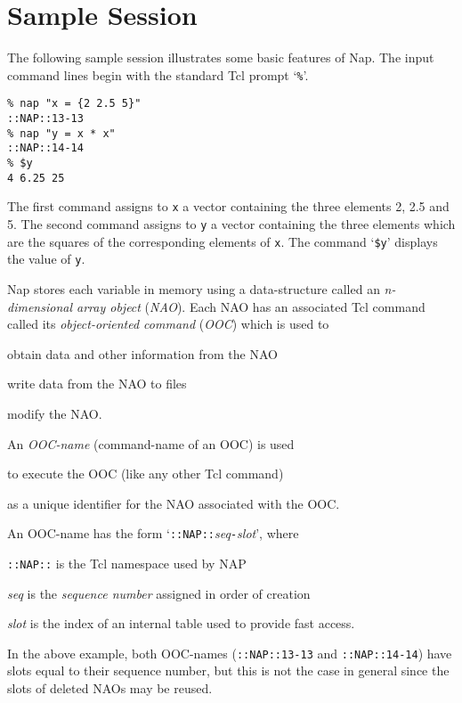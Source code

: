 
\section{Sample Session}

The following sample session illustrates some basic features of
    Nap. The input command lines begin with the standard Tcl prompt
    `\texttt{\%}'.
    \begin{verbatim}
% nap "x = {2 2.5 5}"
::NAP::13-13
% nap "y = x * x"
::NAP::14-14
% $y
4 6.25 25
\end{verbatim}

The first command assigns to 
    \texttt{x} a vector containing the three elements 2, 2.5 and 5.
    The second command assigns to 
    \texttt{y} a vector containing the three elements which are the
    squares of the corresponding elements of 
    \texttt{x}. The command `\texttt{\$y}' displays the value of 
    \texttt{y}.

Nap stores each variable in memory using a data-structure called
    an 
    \emph{n-dimensional array object} (\emph{NAO}).
    Each NAO has an associated Tcl command called its 
    \emph{object-oriented command} (\emph{OOC}) which is used to
\begin{bullets}
      \item obtain data and other information from the NAO
      \item write data from the NAO to files
      \item modify the NAO.
\end{bullets}
An \emph{OOC-name} (command-name of an OOC) is used
\begin{bullets}
      \item to execute the OOC (like any other Tcl command)
      \item as a unique identifier for the NAO associated with the OOC.
\end{bullets}
An OOC-name has the form 
      `\texttt{::NAP::}\emph{seq}\texttt{-}\emph{slot}', where
\begin{simpleitems}
      \item 
      \texttt{::NAP::} is the Tcl namespace used by NAP
      \item 
      \emph{seq} is the \emph{sequence number} assigned in order of creation
      \item 
      \emph{slot} is the index of an internal table used to provide fast access.
\end{simpleitems}
In the above example, both OOC-names (\texttt{::NAP::13-13} and 
      \texttt{::NAP::14-14}) have slots equal to their sequence
      number, but this is not the case in general since the slots of
      deleted NAOs may be reused.

